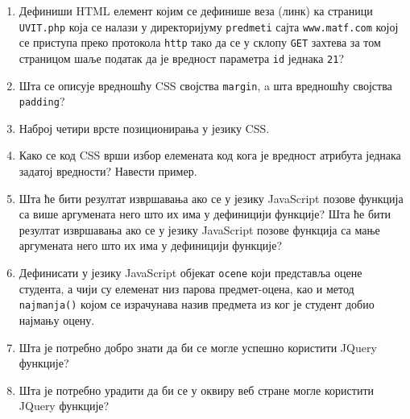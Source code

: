 \documentclass[a4paper]{slides}
\begin{document}
\begin{enumerate}
\hrulefill

\hrulefill

\hrulefill


\item Дефиниши HTML елемент којим се дефинише веза (линк) ка страници \verb|UVIT.php| која се налази у директоријуму \verb|predmeti|
сајта \verb|www.matf.com| којој се приступа преко протокола \verb|http| тако да се у склопу \verb|GET| захтева за том страницом шаље 
податак да је вредност параметра \verb|id| једнака \verb|21|? \hrulefill

\hrulefill


\item Шта се описује вредношћу CSS својства \verb|margin|, a шта вредношћу својства \verb|padding|? \hrulefill

\hrulefill 


\item Наброј четири врсте позиционирања у језику CSS. \hrulefill

\hrulefill 


\item Како се код CSS врши избор елемената код кога је вредност атрибута једнака задатој вредности? Навести пример. \hrulefill

\hrulefill

\hrulefill


\item Шта ће бити резултат извршавања ако се у језику JavaScript позове функција са више аргумената 
него што их има у дефиницији функције? Шта ће бити резултат извршавања ако се у језику JavaScript 
позове функција са мање аргумената него што их има у дефиницији функције?  \hrulefill

\hrulefill


\item Дефинисати у језику JavaScript објекат \verb|ocene| који представља
  оцене студента, а чији су елеменат низ парова предмет-оцена, као и метод \verb|najmanja()| којом се 
	израчунава назив предмета из ког је студент добио најмању оцену.  \hrulefill

\hrulefill

\hrulefill

\hrulefill

\item Шта је потребно добро знати да би се могле успешно користити JQuery функције? \hrulefill

\hrulefill

\item Шта је потребно урадити да би се у оквиру веб стране могле користити JQuery функције? \hrulefill


\end{enumerate}
\end{document}
